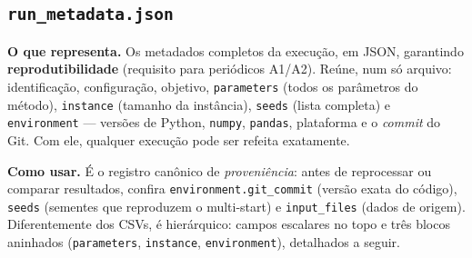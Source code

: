 \documentclass[11pt,a4paper]{article}
\begin{document}
\subsection{\texttt{run\_metadata.json}}

\textbf{O que representa.} Os metadados completos da execução, em JSON, garantindo
\textbf{reprodutibilidade} (requisito para periódicos A1/A2). Reúne, num só
arquivo: identificação, configuração, objetivo, \texttt{parameters} (todos os
parâmetros do método), \texttt{instance} (tamanho da instância), \texttt{seeds}
(lista completa) e \texttt{environment} --- versões de Python, \texttt{numpy},
\texttt{pandas}, plataforma e o \emph{commit} do Git. Com ele, qualquer execução
pode ser refeita exatamente.

\textbf{Como usar.} É o registro canônico de \emph{proveniência}: antes de
reprocessar ou comparar resultados, confira \texttt{environment.git\_commit} (versão
exata do código), \texttt{seeds} (sementes que reproduzem o multi-start) e
\texttt{input\_files} (dados de origem). Diferentemente dos CSVs, é hierárquico:
campos escalares no topo e três blocos aninhados (\texttt{parameters},
\texttt{instance}, \texttt{environment}), detalhados a seguir.
\end{document}
